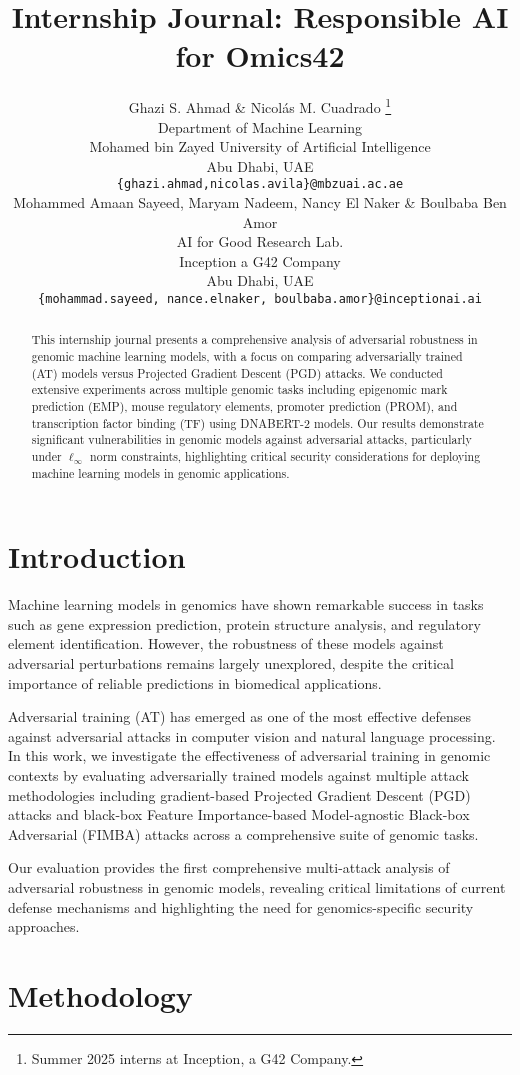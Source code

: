\documentclass{article} %
\title{Internship Journal: Responsible AI for Omics42}
\author{Ghazi S. Ahmad \& Nicolás M. Cuadrado \thanks{Summer 2025 interns at Inception, a G42 Company.} \\
    Department of Machine Learning\\
    Mohamed bin Zayed University of Artificial Intelligence\\
    Abu Dhabi, UAE \\
    \texttt{\{ghazi.ahmad,nicolas.avila\}@mbzuai.ac.ae} \\
    \AND
    Mohammed Amaan Sayeed, Maryam Nadeem, Nancy El Naker \& Boulbaba Ben Amor \\
    AI for Good Research Lab.\\
    Inception a G42 Company \\
    Abu Dhabi, UAE \\
    \texttt{\{mohammad.sayeed, nance.elnaker, boulbaba.amor\}@inceptionai.ai} \\
    }
\begin{document}
\maketitle

\begin{abstract}
This internship journal presents a comprehensive analysis of adversarial robustness in genomic machine learning models, with a focus on comparing adversarially trained (AT) models versus Projected Gradient Descent (PGD) attacks. We conducted extensive experiments across multiple genomic tasks including epigenomic mark prediction (EMP), mouse regulatory elements, promoter prediction (PROM), and transcription factor binding (TF) using DNABERT-2 models. Our results demonstrate significant vulnerabilities in genomic models against adversarial attacks, particularly under $\ell_\infty$ norm constraints, highlighting critical security considerations for deploying machine learning models in genomic applications.
\end{abstract}

\section{Introduction}

Machine learning models in genomics have shown remarkable success in tasks such as gene expression prediction, protein structure analysis, and regulatory element identification. However, the robustness of these models against adversarial perturbations remains largely unexplored, despite the critical importance of reliable predictions in biomedical applications.

Adversarial training (AT) has emerged as one of the most effective defenses against adversarial attacks in computer vision and natural language processing. In this work, we investigate the effectiveness of adversarial training in genomic contexts by evaluating adversarially trained models against multiple attack methodologies including gradient-based Projected Gradient Descent (PGD) attacks and black-box Feature Importance-based Model-agnostic Black-box Adversarial (FIMBA) attacks across a comprehensive suite of genomic tasks.

Our evaluation provides the first comprehensive multi-attack analysis of adversarial robustness in genomic models, revealing critical limitations of current defense mechanisms and highlighting the need for genomics-specific security approaches.

\section{Methodology}
\end{document}
